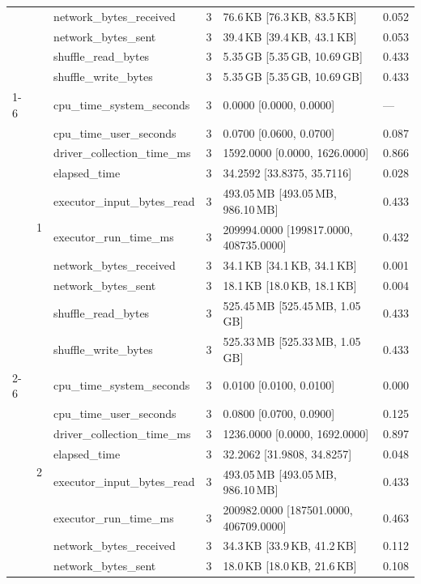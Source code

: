 \begin{tabular}{lllrll}
 &  & network_bytes_received & 3 & 76.6\,KB [76.3\,KB, 83.5\,KB] & 0.052 \\
 &  & network_bytes_sent & 3 & 39.4\,KB [39.4\,KB, 43.1\,KB] & 0.053 \\
 &  & shuffle_read_bytes & 3 & 5.35\,GB [5.35\,GB, 10.69\,GB] & 0.433 \\
 &  & shuffle_write_bytes & 3 & 5.35\,GB [5.35\,GB, 10.69\,GB] & 0.433 \\
\cline{1-6} \cline{2-6}
\multirow[t]{30}{*}{national-scale-spatial-join-databricks-broadcast-2-nodes-small} & \multirow[t]{10}{*}{1} & cpu_time_system_seconds & 3 & 0.0000 [0.0000, 0.0000] & --- \\
 &  & cpu_time_user_seconds & 3 & 0.0700 [0.0600, 0.0700] & 0.087 \\
 &  & driver_collection_time_ms & 3 & 1592.0000 [0.0000, 1626.0000] & 0.866 \\
 &  & elapsed_time & 3 & 34.2592 [33.8375, 35.7116] & 0.028 \\
 &  & executor_input_bytes_read & 3 & 493.05\,MB [493.05\,MB, 986.10\,MB] & 0.433 \\
 &  & executor_run_time_ms & 3 & 209994.0000 [199817.0000, 408735.0000] & 0.432 \\
 &  & network_bytes_received & 3 & 34.1\,KB [34.1\,KB, 34.1\,KB] & 0.001 \\
 &  & network_bytes_sent & 3 & 18.1\,KB [18.0\,KB, 18.1\,KB] & 0.004 \\
 &  & shuffle_read_bytes & 3 & 525.45\,MB [525.45\,MB, 1.05\,GB] & 0.433 \\
 &  & shuffle_write_bytes & 3 & 525.33\,MB [525.33\,MB, 1.05\,GB] & 0.433 \\
\cline{2-6}
 & \multirow[t]{10}{*}{2} & cpu_time_system_seconds & 3 & 0.0100 [0.0100, 0.0100] & 0.000 \\
 &  & cpu_time_user_seconds & 3 & 0.0800 [0.0700, 0.0900] & 0.125 \\
 &  & driver_collection_time_ms & 3 & 1236.0000 [0.0000, 1692.0000] & 0.897 \\
 &  & elapsed_time & 3 & 32.2062 [31.9808, 34.8257] & 0.048 \\
 &  & executor_input_bytes_read & 3 & 493.05\,MB [493.05\,MB, 986.10\,MB] & 0.433 \\
 &  & executor_run_time_ms & 3 & 200982.0000 [187501.0000, 406709.0000] & 0.463 \\
 &  & network_bytes_received & 3 & 34.3\,KB [33.9\,KB, 41.2\,KB] & 0.112 \\
 &  & network_bytes_sent & 3 & 18.0\,KB [18.0\,KB, 21.6\,KB] & 0.108 \\

\end{tabular}
